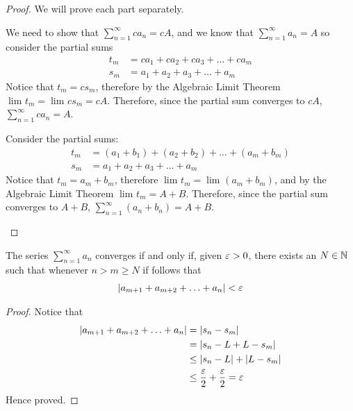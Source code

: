 \begin{proof}
	We will prove each part separately.
	\begin{romanize}
		\item We need to show that $\sum_{n=1}^{\infty} ca_n = cA$, and we know that $\sum_{n=1}^{\infty} a_n = A$ so consider the partial sums 
			\begin{align}
				t_m &= c a_1 + c a_2 + c a_3 + \ldots + c a_m \\
				s_m &= a_1 + a_2 + a_3 + \ldots + a_m
			\end{align}
		Notice that $t_m = c s_m$, therefore by the Algebraic Limit Theorem  $\lim_{} t_m = \lim_{} c s_m = cA$. Therefore, since the partial sum converges to $cA$, $\sum_{n=1}^{\infty} c a_n = A$.
		\item Consider the partial sums:
			\begin{align}
				t_m &= (a_1 + b_1) + \left( a_2 + b_2 \right) + \ldots + \left( a_m + b_m \right)\\
				s_m &= a_1 + a_2 + a_3 + \ldots + a_m
			\end{align}
		Notice that $t_m = a_m + b_m$, therefore $\lim_{} t_m = \lim_{} \left( a_m + b_m \right)$, and by the Algebraic Limit Theorem $\lim_{} t_m = A + B$. Therefore, since the partial sum converges to $A + B$, $\sum_{n=1}^{\infty} \left( a_n + b_n \right) = A + B$.

	\end{romanize}
\end{proof}

\begin{theorem}
	The series $\sum_{n=1}^{\infty} a_n$ converges if and only if, given $\e > 0$, there exists an $N \in \mathbb{N}$ such that whenever $n > m \ge N$ if follows that
	\begin{align}
		\left|a_{m+1} + a_{m+2} + \ldots + a_n\right| < \e
	\end{align}
\end{theorem}

\begin{proof}
	Notice that 
	\begin{align}
		\left|a_{m+1} + a_{m+2} + \ldots + a_{n}\right|	&= \left|s_n - s_m\right|\\
								&= \left|s_n - L + L - s_m\right|\\
								&\le \left|s_n - L\right| + \left|L - s_m\right|\\
								&\le \frac{\e}{2} + \frac{\e}{2} = \e
	\end{align}
	Hence proved.
\end{proof}

